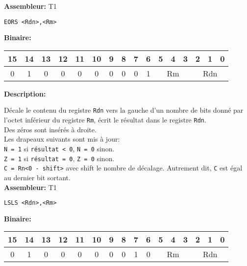 \textbf{Assembleur:} T1

\begin{lstlisting}
EORS <Rdn>,<Rm>
\end{lstlisting}

\textbf{Binaire:}\\

\begin{tabular}{| c c c c c c c c c c c c c c c c |}
\hline
15 & 14 & 13 & 12 & 11 & 10 & \multicolumn{1}{|c}{9} & 8 & 7 & 6 & \multicolumn{1}{|c}{5} & 4 & 3 & \multicolumn{1}{|c}{2} & 1 & 0 \\
\hline
0 & 1 & 0 & 0 & 0 & 0 & \multicolumn{1}{|c}{0} & 0 & 0 & 1 & \multicolumn{3}{|c}{Rm} & \multicolumn{3}{|c|}{Rdn} \\
\hline
\end{tabular}



\textbf{Description: }

Décale le contenu du registre \texttt{Rdn} vers la gauche d'un nombre de bits donné par l'octet inférieur du registre \texttt{Rm}, écrit le résultat dans le registre \texttt{Rdn}.\\
Des zéros sont insérés à droite.\\
Les drapeaux suivants sont mis à jour:\\
\texttt{N = 1} si \texttt{résultat < 0}, \texttt{N = 0} sinon.\\
\texttt{Z = 1} si \texttt{résultat = 0}, \texttt{Z = 0} sinon.\\
\texttt{C = Rn<0 - shift>} avec shift le nombre de décalage. Autrement dit, \texttt{C} est égal au dernier bit sortant.\\

\textbf{Assembleur:} T1

\begin{lstlisting}
LSLS <Rdn>,<Rm>
\end{lstlisting}

\textbf{Binaire:}\\

\begin{tabular}{| c c c c c c c c c c c c c c c c |}
\hline
15 & 14 & 13 & 12 & 11 & 10 & \multicolumn{1}{|c}{9} & 8 & 7 & 6 & \multicolumn{1}{|c}{5} & 4 & 3 & \multicolumn{1}{|c}{2} & 1 & 0 \\
\hline
0 & 1 & 0 & 0 & 0 & 0 & \multicolumn{1}{|c}{0} & 0 & 1 & 0 & \multicolumn{3}{|c}{Rm} & \multicolumn{3}{|c|}{Rdn} \\
\hline
\end{tabular}



